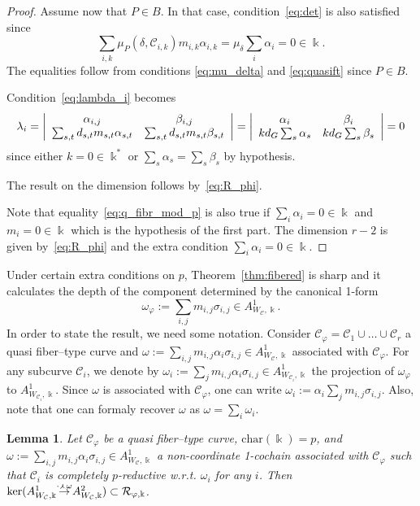 \documentclass[11pt]{amsart}
\def\cC{\mathcal{C}}
\def\cR{{\mathcal R}}
\def\kk{\Bbbk}
\def\w{\omega}
\def\rightmap#1{\smash{\mathop{\rightarrow}\limits^{#1}}}
\theoremstyle{plain}
\newtheorem{lemma}[thm]{Lemma}
\theoremstyle{definition}
\begin{document}
\begin{proof}
Assume now that $P\in B$. In that case, condition~\eqref{eq:det} is also satisfied 
since 
\begin{equation} \label{eq:q_fibr_mod_p}
    \sum_{i,k} \mu_P(\delta,\cC_{i,k})m_{i,k}\alpha_{i,k}=
\mu_\delta \sum_i \alpha_i = 0\in\kk.
\end{equation}
The equalities follow from conditions \eqref{eq:mu_delta} and \eqref{eq:quasift} since $P\in B$. 

Condition~\eqref{eq:lambda_i} becomes
\begin{equation} \label{eq:non_base_P_lambda}
\lambda_i=
\left|
\array{cc}
\alpha_{i,j} & \beta_{i,j}\\
\sum_{s,t} d_{s,t}m_{s,t}\alpha_{s,t} & \sum_{s,t} d_{s,t}m_{s,t}\beta_{s,t}\\
\endarray
\right|=
    \left|
\array{cc}
\alpha_{i} & \beta_{i}\\
kd_G\sum_{s} \alpha_{s} & kd_G\sum_{s} \beta_{s}\\
\endarray
\right|=
0
\end{equation}
since either $k=0\in\kk^*$ or $\sum_{s} \alpha_{s}=\sum_{s} \beta_{s}$ by hypothesis.

The result on the dimension follows by~\eqref{eq:R_phi}.

Note that equality~\eqref{eq:q_fibr_mod_p} is also true if $\sum_i\alpha_i=0\in\kk$ and $m_i=0\in\kk$ which is the hypothesis of the first part. The dimension $r-2$ is given by~\eqref{eq:R_phi} and the extra condition $\sum_i\alpha_i=0\in\kk$.
\end{proof}

Under certain extra conditions on $p$, Theorem~\ref{thm:fibered} is sharp and it calculates the depth of the component determined 
by the canonical 1-form $$\w_\varphi:= \sum_{i,j} m_{i,j} \sigma_{i,j}\in A^1_{W_\cC,\kk}.$$
In order to state the result, we need some notation. Consider $\cC_\varphi=\cC_1\cup\dots\cup\cC_r$ a quasi fiber--type curve and 
$\w:= \sum_{i,j} m_{i,j} \alpha_{i} \sigma_{i,j}\in A^1_{W_\cC,\kk}$ associated with $\cC_\varphi$. For any subcurve $\cC_i$, we denote by
$\w_{i}:= \sum_{j} m_{i,j} \alpha_{i} \sigma_{i,j}\in A^1_{W_{\cC_i},\kk}$ the projection of $\w_{\varphi}$ to $A^1_{W_{\cC_i},\kk}$.
Since $\w$ is associated with $\cC_\varphi$, one can write $\w_{i}:= \alpha_{i} \sum_{j} m_{i,j} \sigma_{i,j}$.
Also, note that one can formaly recover $\w$ as  $\w=\sum_i \w_{i}$.

\begin{lemma}
\label{prop:fiber_p_reductive}
Let $\cC_\varphi$ be a quasi fiber--type curve, $\mathrm{char}(\kk)=p$, and $\w := \sum_{i,j} m_{i,j}\alpha_i \sigma_{i,j}\in A^1_{W_\cC,\kk}$
a non-coordinate 1-cochain associated with $\cC_\varphi$ such that $\cC_i$ is completely $p$-reductive w.r.t. $\w_{i}$ for any $i$.
Then 
$\ker(A^1_{W_{\cC}, \kk}\rightmap{\cdot\curlywedge\w} A^2_{W_{\cC},\kk})\subset\cR_{\varphi,\kk}$.
\end{lemma}
\end{document}
